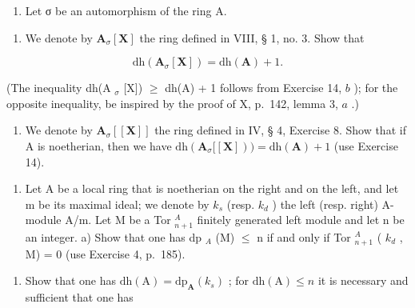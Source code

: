 \begin{enumerate}
\def\labelenumi{\arabic{enumi})}
\setcounter{enumi}{14}
\tightlist
\item
  Let σ be an automorphism of the ring A.
\end{enumerate}

\begin{enumerate}
\def\labelenumi{\alph{enumi})}
\tightlist
\item
  We denote by \(\mathbf{A}_{\sigma}[\mathbf{X}]\) the ring defined in VIII, § 1, no. 3. Show that
\end{enumerate}

\[
\mathrm{dh} (\mathbf {A} _ {\sigma} [ \mathbf {X} ]) = \mathrm{dh} (\mathbf {A}) + 1.
\]

(The inequality dh(A \(_{\sigma}\) {[}X{]}) \(\geqslant\) dh(A) + 1 follows from Exercise 14, \(b\) ); for the opposite inequality, be inspired by the proof of X, p.~142, lemma 3, \(a\) .)

\begin{enumerate}
\def\labelenumi{\alph{enumi})}
\setcounter{enumi}{1}
\tightlist
\item
  We denote by \(\mathbf{A}_{\sigma}[[\mathbf{X}]]\) the ring defined in IV, § 4, Exercise 8. Show that if A is noetherian, then we have \(\mathrm{dh}(\mathbf{A}_{\sigma}[[\mathbf{X}]))=\mathrm{dh}(\mathbf{A})+1\) (use Exercise 14).
\end{enumerate}

\begin{enumerate}
\def\labelenumi{\arabic{enumi})}
\setcounter{enumi}{15}
\tightlist
\item
  Let A be a local ring that is noetherian on the right and on the left, and let m be its maximal ideal; we denote by \(k_{s}\) (resp. \(k_{d}\) ) the left (resp. right) A-module A/m. Let M be a Tor \(_{n+1}^{A}\) finitely generated left module and let n be an integer. a) Show that one has dp \(_{A}\) (M) \(\leqslant\) n if and only if Tor \(_{n+1}^{A}\) ( \(k_{d}\) , M) = 0 (use Exercise 4, p.~185).
\end{enumerate}

\begin{enumerate}
\def\labelenumi{\alph{enumi})}
\setcounter{enumi}{1}
\tightlist
\item
  Show that one has \(\mathrm{dh(A)} = \mathrm{dp}_{\mathbf{A}}(k_s)\) ; for \(\mathrm{dh(A)} \leqslant n\) it is necessary and sufficient that one has
\end{enumerate}

